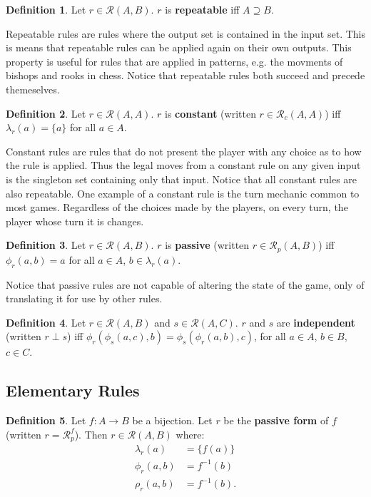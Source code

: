 \documentclass{article}
\theoremstyle{definition}
\newtheorem{definition}{Definition}[subsection]
\theoremstyle{plain}
\def\rule{\mathcal{R}}
\begin{document}
\begin{definition} 
  Let $ r \in \rule (A, B) $. $ r $ is \textbf{repeatable} iff $ A \supseteq B $.
\end{definition}

Repeatable rules are rules where the output set is contained in the input set.
This is means that repeatable rules can be applied again on their own outputs.
This property is useful for rules that are applied in patterns,
e.g. the movments of bishops and rooks in chess.
Notice that repeatable rules both succeed and precede themeselves.

\begin{definition}
  Let $ r \in \rule (A, A) $. $ r $ is \textbf{constant}
  (written $ r \in \rule_c (A, A) $)
  iff $ \lambda_r (a) = \{ a \} $ for all $ a \in A $.
\end{definition}

Constant rules are rules that do not present the player with any choice as to how the rule is applied.
Thus the legal moves from a constant rule on any given input is the singleton set containing only that input.
Notice that all constant rules are also repeatable.
One example of a constant rule is the turn mechanic common to most games.
Regardless of the choices made by the players,
on every turn, the player whose turn it is changes.

\begin{definition}
  Let $ r \in \rule (A, B) $. $ r $ is \textbf{passive}
  (written $ r \in \rule_p (A, B) $)
  iff $ \phi_r (a, b) = a $ for all $ a \in A $, $ b \in \lambda_r (a) $.
\end{definition}

Notice that passive rules are not capable of altering the state of the game,
only of translating it for use by other rules.

\begin{definition}
  Let $ r \in \rule (A, B) $
  and $ s \in \rule (A, C) $.
  $ r $ and $ s $ are \textbf{independent}
  (written $ r \perp s $)
  iff $ \phi_r (\phi_s (a, c), b) = \phi_s (\phi_r (a, b), c) $, 
  for all $ a \in A $, $ b \in B $, $ c \in C $.
\end{definition}

\subsection{Elementary Rules} %

\begin{definition}
  Let $ f : A \rightarrow B $ be a bijection.
  Let $ r $ be the \textbf{passive form} of $ f $
  (written $ r = \rule_p^f $).
  Then $ r \in \rule (A, B) $ where:
  \begin{align}
    \lambda_r (a)    & = \{ f (a) \} \\
       \phi_r (a, b) & = f^{-1} (b) \\
       \rho_r (a, b) & = f^{-1} (b).
  \end{align}
\end{definition}
\end{document}
